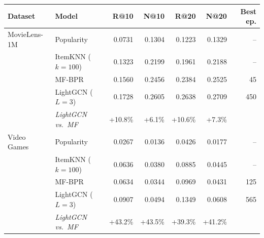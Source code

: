 \begin{tabular}{llrrrrr}
\toprule
Dataset & Model & R@10 & N@10 & R@20 & N@20 & Best ep. \\
\midrule
MovieLens-1M & Popularity & 0.0731 & 0.1304 & 0.1223 & 0.1329 & -- \\
 & ItemKNN ($k{=}100$) & 0.1323 & 0.2199 & 0.1961 & 0.2188 & -- \\
 & MF-BPR & 0.1560 & 0.2456 & 0.2384 & 0.2525 & 45 \\
 & LightGCN ($L{=}3$) & 0.1728 & 0.2605 & 0.2638 & 0.2709 & 450 \\
 & \emph{LightGCN vs.\ MF} & +10.8\% & +6.1\% & +10.6\% & +7.3\% & \\
\midrule
Video Games & Popularity & 0.0267 & 0.0136 & 0.0426 & 0.0177 & -- \\
 & ItemKNN ($k{=}100$) & 0.0636 & 0.0380 & 0.0885 & 0.0445 & -- \\
 & MF-BPR & 0.0634 & 0.0344 & 0.0969 & 0.0431 & 125 \\
 & LightGCN ($L{=}3$) & 0.0907 & 0.0494 & 0.1349 & 0.0608 & 565 \\
 & \emph{LightGCN vs.\ MF} & +43.2\% & +43.5\% & +39.3\% & +41.2\% & \\
\bottomrule
\end{tabular}
